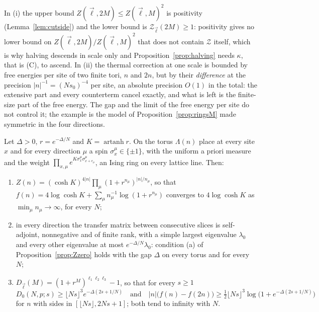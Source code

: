 In (i) the upper bound $Z(\vec\ell,2M)\le Z(\vec\ell,M)^2$ is positivity
(Lemma~\ref{lem:cutside}) and the lower bound is $\mathcal Z_{\vec\ell}(2M)
\ge1$: positivity gives no lower bound on $Z(\vec\ell,2M)/Z(\vec\ell,M)^2$
that does not contain $\mathcal Z$ itself, which is why halving descends in
scale only and Proposition~\ref{prop:halving} needs $\kappa$, that is (C),
to ascend. In (ii) the thermal correction at one scale is bounded by free
energies per site of two finite tori, $n$ and $2n$, but by their
\emph{difference} at the precision $|n|^{-1}=(Ns_0)^{-4}$ per site, an
absolute precision $O(1)$ in the total: the extensive part and every
counterterm cancel exactly, and what is left is the finite-size part of the
free energy. The gap and the limit of the free energy per site do not
control it; the example is the model of Proposition~\ref{prop:ringsM} made
symmetric in the four directions.

\begin{proposition}\label{prop:ringsfour}
Let $\Delta>0$, $r=e^{-\Delta/N}$ and $K=\operatorname{artanh}r$. On the
torus $\Lambda(n)$ place at every site $x$ and for every direction $\mu$ a
spin $\sigma^\mu_x\in\{\pm1\}$, with the uniform a priori measure and the
weight $\prod_{x,\mu}e^{K\sigma^\mu_x\sigma^\mu_{x+e_\mu}}$, an Ising ring on
every lattice line. Then:
\begin{enumerate}[label=\textup{(\roman*)},leftmargin=*]
\item $Z(n)=(\cosh K)^{4|n|}\prod_{\mu}(1+r^{n_\mu})^{|n|/n_\mu}$, so that
$f(n)=4\log\cosh K+\sum_\mu n_\mu^{-1}\log(1+r^{n_\mu})$ converges to $4\log
\cosh K$ as $\min_\mu n_\mu\to\infty$, for every $N$;
\item in every direction the transfer matrix between consecutive slices is
self-adjoint, nonnegative and of finite rank, with a simple largest
eigenvalue $\lambda_0$ and every other eigenvalue at most $e^{-\Delta/N}
\lambda_0$: condition \textup{(a)} of Proposition~\ref{prop:Zzero} holds with
the gap $\Delta$ on every torus and for every $N$;
\item $D_{\vec\ell}(M)=(1+r^M)^{\ell_1\ell_2\ell_3}-1$, so that for every
$s\ge1$
\[
D_0(N,p;s)\ge\lfloor Ns\rfloor^3e^{-\Delta(2s+1/N)}\quad\text{and}\quad
|n|\bigl(f(n)-f(2n)\bigr)\ge\tfrac12\lfloor Ns\rfloor^3\log\bigl(1+
e^{-\Delta(2s+1/N)}\bigr)
\]
for $n$ with sides in $[\lfloor Ns\rfloor,2Ns+1]$; both tend to infinity with
$N$.
\end{enumerate}
\end{proposition}

